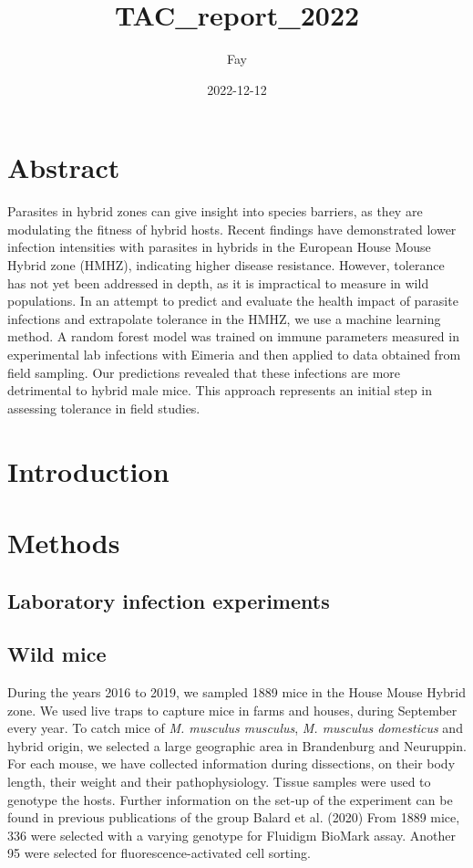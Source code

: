 \documentclass[
]{article}
\title{TAC\_report\_2022}
\author{Fay}
\date{2022-12-12}
\begin{document}
\maketitle

\hypertarget{abstract}{%
\section{Abstract}\label{abstract}}

Parasites in hybrid zones can give insight into species barriers, as
they are modulating the fitness of hybrid hosts. Recent findings have
demonstrated lower infection intensities with parasites in hybrids in
the European House Mouse Hybrid zone (HMHZ), indicating higher disease
resistance. However, tolerance has not yet been addressed in depth, as
it is impractical to measure in wild populations. In an attempt to
predict and evaluate the health impact of parasite infections and
extrapolate tolerance in the HMHZ, we use a machine learning method. A
random forest model was trained on immune parameters measured in
experimental lab infections with Eimeria and then applied to data
obtained from field sampling. Our predictions revealed that these
infections are more detrimental to hybrid male mice. This approach
represents an initial step in assessing tolerance in field studies.

\hypertarget{introduction}{%
\section{Introduction}\label{introduction}}

\hypertarget{methods}{%
\section{Methods}\label{methods}}

\hypertarget{laboratory-infection-experiments}{%
\subsection{Laboratory infection
experiments}\label{laboratory-infection-experiments}}

\hypertarget{wild-mice}{%
\subsection{Wild mice}\label{wild-mice}}

During the years 2016 to 2019, we sampled 1889 mice in the House Mouse
Hybrid zone. We used live traps to capture mice in farms and houses,
during September every year. To catch mice of \emph{M. musculus
musculus}, \emph{M. musculus domesticus} and hybrid origin, we selected
a large geographic area in Brandenburg and Neuruppin. For each mouse, we
have collected information during dissections, on their body length,
their weight and their pathophysiology. Tissue samples were used to
genotype the hosts. Further information on the set-up of the experiment
can be found in previous publications of the group Balard et al. (2020)
From 1889 mice, 336 were selected with a varying genotype for Fluidigm
BioMark assay. Another 95 were selected for fluorescence-activated cell
sorting.
\end{document}
